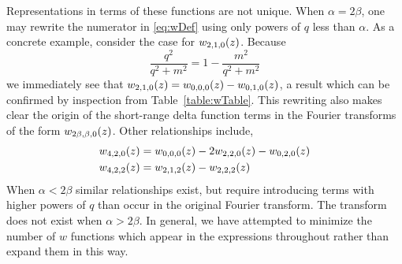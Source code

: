 Representations in terms of these functions are not unique. When $\alpha=2\beta$, one may rewrite the numerator in \eqref{eq:wDef} using only powers of $q$ less than $\alpha$. As a concrete example, consider the case for $w_{2,1,0}(z)$. Because
\begin{equation}
\frac{q^2}{q^2+m^2}=1-\frac{m^2}{q^2+m^2}
\end{equation}
we immediately see that $w_{2,1,0}(z)=w_{0,0,0}(z)-w_{0,1,0}(z)$, a result which can be confirmed by inspection from Table~\ref{table:wTable}. This rewriting also makes clear the origin of the short-range delta function terms in the Fourier transforms of the form $w_{2\beta,\beta,0}(z)$. Other relationships include,
\begin{align}
w_{4,2,0}(z)&=w_{0,0,0}(z)-2 w_{2,2,0}(z)-w_{0,2,0}(z) \\
w_{4,2,2}(z)&=w_{2,1,2}(z)-w_{2,2,2}(z)
\end{align}
When $\alpha < 2\beta$ similar relationships exist, but require introducing terms with higher powers of $q$ than occur in the original Fourier transform. The transform does not exist when $\alpha>2\beta$. In general, we have attempted to minimize the number of $w$ functions which appear in the expressions throughout  rather than expand them in this way.
